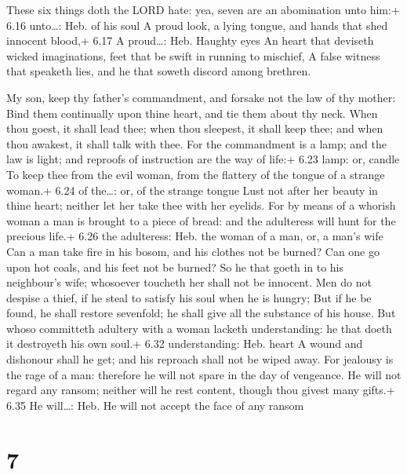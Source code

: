  These six things doth the LORD hate: yea, seven are an
abomination unto him:+ 6.16 unto\ldots: Heb. of his soul  A
proud look, a lying tongue, and hands that shed innocent blood,+ 6.17 A
proud\ldots: Heb. Haughty eyes  An heart that deviseth
wicked imaginations, feet that be swift in running to mischief,
 A false witness that speaketh lies, and he that soweth
discord among brethren.

 My son, keep thy father's commandment, and forsake not
the law of thy mother:  Bind them continually upon thine
heart, and tie them about thy neck.  When thou goest, it
shall lead thee; when thou sleepest, it shall keep thee; and when thou
awakest, it shall talk with thee.  For the commandment is a
lamp; and the law is light; and reproofs of instruction are the way of
life:+ 6.23 lamp: or, candle  To keep thee from the evil
woman, from the flattery of the tongue of a strange woman.+ 6.24 of
the\ldots: or, of the strange tongue  Lust not after her
beauty in thine heart; neither let her take thee with her eyelids.
 For by means of a whorish woman a man is brought to a
piece of bread: and the adulteress will hunt for the precious life.+
6.26 the adulteress: Heb. the woman of a man, or, a man's wife
 Can a man take fire in his bosom, and his clothes not be
burned?  Can one go upon hot coals, and his feet not be
burned?  So he that goeth in to his neighbour's wife;
whosoever toucheth her shall not be innocent.  Men do not
despise a thief, if he steal to satisfy his soul when he is hungry;
 But if he be found, he shall restore sevenfold; he shall
give all the substance of his house.  But whoso committeth
adultery with a woman lacketh understanding: he that doeth it destroyeth
his own soul.+ 6.32 understanding: Heb. heart  A wound and
dishonour shall he get; and his reproach shall not be wiped away.
 For jealousy is the rage of a man: therefore he will not
spare in the day of vengeance.  He will not regard any
ransom; neither will he rest content, though thou givest many gifts.+
6.35 He will\ldots: Heb. He will not accept the face of any ransom

\hypertarget{section-6}{%
\section{7}\label{section-6}}


